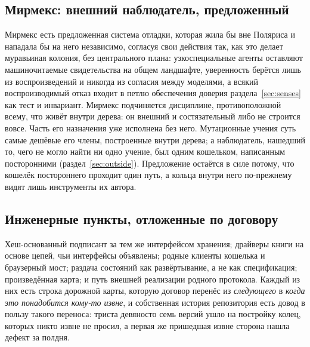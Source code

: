 \subsection{Мирмекс: внешний наблюдатель, предложенный}

Мирмекс есть предложенная система отладки, которая жила бы вне Поляриса и нападала бы на него
независимо, согласуя свои действия так, как это делает муравьиная колония, без центрального плана:
узкоспециальные агенты оставляют машиночитаемые свидетельства на общем ландшафте, уверенность
берётся лишь из воспроизведений и никогда из согласия между моделями, а всякий воспроизводимый
отказ входит в петлю обеспечения доверия раздела~\ref{sec:senses} как тест и инвариант. Мирмекс
подчиняется дисциплине, противоположной всему, что живёт внутри дерева: он внешний и
состязательный либо не строится вовсе. Часть его назначения уже исполнена без него. Мутационные
учения суть самые дешёвые его члены, построенные внутри дерева; а наблюдатель, нашедший то, чего
не могло найти ни одно учение, был одним кошельком, написанным посторонними
(раздел~\ref{sec:outside}). Предложение остаётся в силе потому, что кошелёк постороннего проходит
один путь, а кольца внутри него по-прежнему видят лишь инструменты их автора. \sFut

\subsection{Инженерные пункты, отложенные по договору}

Хеш-основанный подписант за тем же интерфейсом хранения; драйверы книги на основе цепей, чьи
интерфейсы объявлены; родные клиенты кошелька и браузерный мост; раздача состояний как
развёртывание, а не как спецификация; произведённая карта; и путь внешней реализации родного
протокола. Каждый из них есть строка дорожной карты, которую договор перенёс из \emph{следующего}
в \emph{когда это понадобится кому-то извне}, и собственная история репозитория есть довод в
пользу такого переноса: триста девяносто семь версий ушло на постройку колец, которых никто извне
не просил, а первая же пришедшая извне сторона нашла дефект за полдня.
